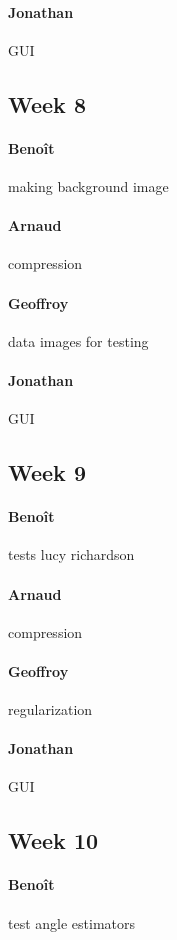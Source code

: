 \paragraph{Jonathan} GUI

\subsection*{Week 8}
\paragraph{Benoît} making background image
\paragraph{Arnaud} compression
\paragraph{Geoffroy} data images for testing
\paragraph{Jonathan} GUI

\subsection*{Week 9}
\paragraph{Benoît} tests lucy richardson
\paragraph{Arnaud} compression
\paragraph{Geoffroy} regularization
\paragraph{Jonathan} GUI

\subsection*{Week 10}
\paragraph{Benoît} test angle estimators
